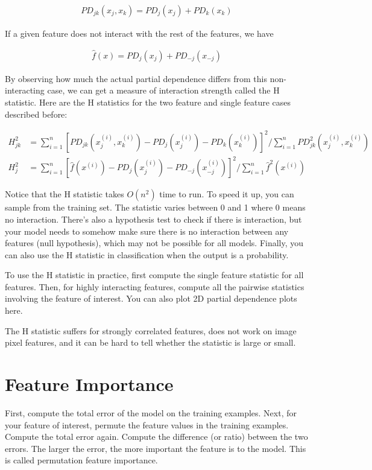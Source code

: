 \documentclass[a4paper]{article}
\begin{document}
\begin{align}
  PD_{jk}(x_j, x_k) = PD_j(x_j) + PD_k(x_k)
\end{align}

If a given feature does not interact with the rest of the features, we have

\begin{align}
  \hat{f}(x) = PD_j(x_j) + PD_{-j}(x_{-j})
\end{align}

By observing how much the actual partial dependence differs from this
non-interacting case, we can get a measure of interaction strength called the
H statistic. Here are the H statistics for the two feature and single feature
cases described before:

\begin{align}
  H_{jk}^2 &= \sum_{i=1}^{n}{[
    PD_{jk}(x_j^{(i)}, x_k^{(i)})
    - PD_j(x_j^{(i)})
    - PD_k(x_k^{(i)})
  ]^2} / \sum_{i=1}^{n}{PD^2_{jk}(x_j^{(i)}, x_k^{(i)})} \\
  H_j^2 &= \sum_{i=1}^{n}{[
    \hat{f}(x^{(i)})
    - PD_j(x_j^{(i)})
    - PD_{-j}(x_{-j}^{(i)})
  ]^2} / \sum_{i=1}^{n}{\hat{f}^2(x^{(i)})}
\end{align}

Notice that the H statistic takes $O(n^2)$ time to run. To speed it up, you
can sample from the training set. The statistic varies between 0 and 1 where
0 means no interaction. There's also a hypothesis test to check if there is
interaction, but your model needs to somehow make sure there is no interaction
between any features (null hypothesis), which may not be possible for all
models. Finally, you can also use the H statistic in classification when the
output is a probability.

To use the H statistic in practice, first compute the single feature statistic
for all features. Then, for highly interacting features, compute all the
pairwise statistics involving the feature of interest. You can also plot 2D
partial dependence plots here.

The H statistic suffers for strongly correlated features, does not work on
image pixel features, and it can be hard to tell whether the statistic is large
or small.

\section{Feature Importance}
First, compute the total error of the model on the training examples. Next,
for your feature of interest, permute the feature values in the training
examples. Compute the total error again. Compute the difference (or ratio)
between the two errors. The larger the error, the more important the feature is
to the model. This is called permutation feature importance.
\end{document}
